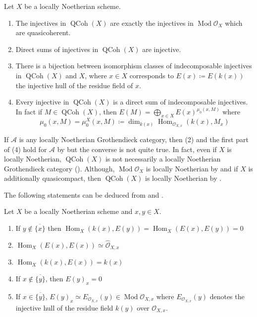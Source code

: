 \documentclass[12pt,oneside]{amsart}
\DeclareMathOperator{\Hom}{Hom}
\DeclareMathOperator{\Mod}{Mod}
\DeclareMathOperator{\QCoh}{QCoh}
\begin{document}
\begin{theorem} \label{matlisthy}
Let $X$ be a locally Noetherian scheme.
\begin{enumerate}
\item The injectives in $\QCoh(X)$ are exactly the injectives in $\Mod \mathcal{O}_X$ which are quasicoherent.

\item Direct sums of injectives in $\QCoh(X)$ are injective.

\item There is a bijection between isomorphism classes of indecomposable injectives in $\QCoh(X)$ and $X$, where $x \in X$ corresponds to $E(x) \coloneq E(k(x))$ the injective hull of the residue field of $x$.

\item Every injective in $\QCoh(X)$ is a direct sum of indecomposable injectives. In fact if $M \in \QCoh(X)$, then $E(M) = \bigoplus_{x \in X} E(x)^{\mu_0(x,M)}$ where
\[
\mu_0(x,M) = \mu_0^X(x,M) \coloneq \dim_{k(x)} \Hom_{\mathcal{O}_{X,x}}(k(x),M_x)
\]

\end{enumerate}
\end{theorem}

\begin{remark} \label{locNoethrem}
If $\mathcal{A}$ is any locally Noetherian Grothendieck category, then (2) and the first part of (4) hold for $\mathcal{A}$ by \cite[IV.2 Theorem 2, IV.2 Proposition 6]{Gab62} but the converse is not quite true. In fact, even if $X$ is locally Noetherian, $\QCoh(X)$ is not necessarily a locally Noetherian Grothendieck category (\cite[pp.\ 135]{Har66}). Although, $\Mod \mathcal{O}_X$ is locally Noetherian by \cite[Prop 7.8]{Har66} and if $X$ is additionally quasicompact, then $\QCoh(X)$ is locally Noetherian by \cite[VI.2]{Gab62}. 
\end{remark}



The following statements can be deduced from \cite[Chapter II Section 7]{Har66} and \cite{Ma58}. 

\begin{prop} \label{matlisprop}Let $X$ be a locally Noetherian scheme and $x,y \in X$.
\begin{enumerate}
\item If $y \not \in \overline{\{x\}}$ then $\Hom_X(k(x),E(y)) = \Hom_X(E(x),E(y)) = 0$

\item $\Hom_X(E(x),E(x)) \simeq \widehat{\mathcal{O}}_{X,x}$

\item  $\Hom_X(k(x),E(x)) = k(x)$

\item If $x \not\in \overline{\{ y \}}$, then $E(y)_x = 0$
\item If $x \in \overline{\{ y \}}$, $E(y)_x \simeq E_{\mathcal{O}_{X,x}}(y) \in \Mod \mathcal{O}_{X,x}$ where $E_{\mathcal{O}_{X,x}}(y)$ denotes the injective hull of the residue field $k(y)$ over $\mathcal{O}_{X,x}$.
\end{enumerate}
\end{prop}
\end{document}
